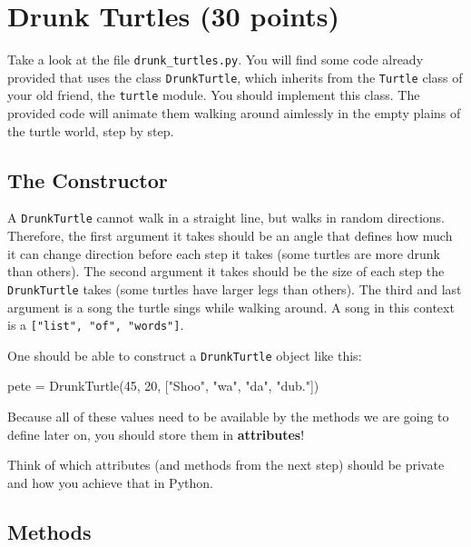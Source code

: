 \section{Drunk Turtles (30 points)}

Take a look at the file {\tt drunk\_turtles.py}. You will find some code already provided that uses the class {\tt DrunkTurtle}, which inherits from the {\tt Turtle} class of your old friend, the {\tt turtle} module. You should implement this class. The provided code will animate them walking around aimlessly in the empty plains of the turtle world, step by step.

\subsection{The Constructor}

A {\tt DrunkTurtle} cannot walk in a straight line, but walks in random directions. Therefore, the first argument it takes should be an angle that defines how much it can change direction before each step it takes (some turtles are more drunk than others). The second argument it takes should be the size of each step the {\tt DrunkTurtle} takes (some turtles have larger legs than others). The third and last argument is a song the turtle sings while walking around. A song in this context is a {\tt ["list", "of", "words"]}.

\vspace{1em}

\noindent One should be able to construct a {\tt DrunkTurtle} object like this:

\begin{pythoncode}
pete = DrunkTurtle(45, 20, ["Shoo", "wa", "da", "dub."])
\end{pythoncode}

\noindent Because all of these values need to be available by the methods we are going to define later on, you should store them in {\bf attributes}!

\vspace{1em}

 Think of which attributes (and methods from the next step) should be private and how you achieve that in Python.

\subsection{Methods}

